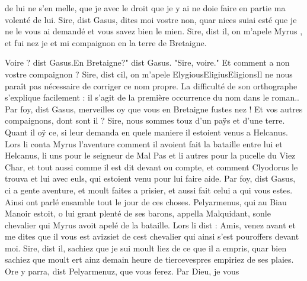 \documentclass{article}
\begin{document}
\begin{pages}
                     de lui ne s’en melle, que 
                     je avec le droit que je 
                     y ai ne doie faire en partie ma volenté de lui.
               Sire, dist Gasus,
                  dites moi vostre non, quar nices 
                     suiai esté que je ne le 
                     vous ai demandé et vous savez bien le mien.
               Sire, dist il, on m’apele Myrus , et fui nez je et mi compaignon en 
                     la terre de
                  Bretaigne.
               
                     Voire ? dist Gasus.En Bretaigne?" dist Gasus. "Sire, voire." Et comment a non vostre compaignon ?
               Sire, dist cil, on m’apele 
                     ElygiousEligiusEligionsIl ne nous paraît pas nécessaire de corriger ce
                     nom propre. La difficulté de son orthographe s'explique facilement : il s'agit
                     de la première occurrence du nom dans le roman..
               Par foy, dist Gasus, merveilles oy que vous en Bretaigne fustes nez ! Et vos 
                     autres compaignons, dont sont il ?
               Sire, nous sommes touz d’un paÿs et d’une
                  terre. Quant il oÿ ce, si leur demanda en
                  quele maniere il estoient venus a Helcanus. Lors li conta Myrus
               l’aventure comment il avoient fait la bataille
                  entre lui et Helcanus, li uns pour le seigneur de Mal Pas et li autres pour la pucelle du Viez
                        Char, et tout aussi comme il est dit
                     devant ou compte, et comment Clyodorus le trouva et lui avec euls, 
                     qui estoient venu pour lui faire aide. Par foy, dist Gasus, ci a gente aventure, et
                  moult faites a prisier, et aussi fait celui a qui vous estes. \pend
            \pstart Ainsi ont parlé ensamble tout le jour de ces choses.
                  Pelyarmenus, qui au Biau Manoir estoit, o lui grant plenté de ses
               barons, appella Malquidant, 
                  sonle chevalier qui Myrus avoit apelé de la
               bataille. Lors li dist : Amis, venez avant et me
                  dites que il vous 
                     est avizsiet de cest chevalier qui ainsi s’est pouroffers
                     devant moi.
               Sire, dist il, sachiez que je sui moult liez de ce
                  que il a empris, quar bien sachiez que moult ert ainz demain heure de 
                     tiercevespres empiriez de ses plaies.
               Ore y parra, dist Pelyarmenuz, que vous ferez. Par Dieu, je vous 

\end{pages}
\end{document}
